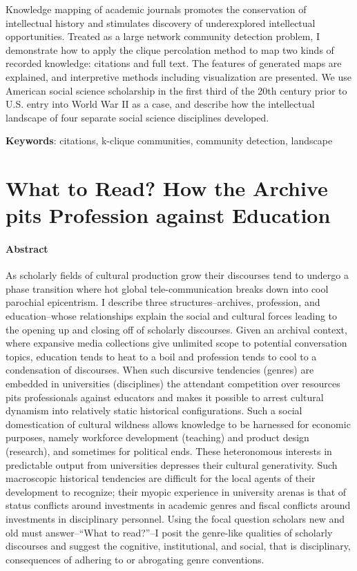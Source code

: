 \documentclass[]{book}
\theoremstyle{definition}
\theoremstyle{definition}
\theoremstyle{definition}
\theoremstyle{remark}
\begin{document}
Knowledge mapping of academic journals promotes the
conservation of intellectual history and stimulates discovery of
underexplored intellectual opportunities. Treated as a large network
community detection problem, I demonstrate how to apply the clique
percolation method to map two kinds of recorded knowledge: citations and
full text. The features of generated maps are explained, and
interpretive methods including visualization are presented. We use
American social science scholarship in the first third of the 20th
century prior to U.S. entry into World War II as a case, and describe
how the intellectual landscape of four separate social science
disciplines developed.




\textbf{Keywords}: citations, k-clique communities, community detection,
landscape

\hypertarget{int}{%
\chapter{What to Read? How the Archive pits Profession against
Education}\label{int}}

\hypertarget{abstract}{%
\subsubsection*{Abstract}\label{abstract}}


As scholarly fields of cultural production grow their
discourses tend to undergo a phase transition where hot global
tele-communication breaks down into cool parochial epicentrism. I
describe three structures--archives, profession, and education--whose
relationships explain the social and cultural forces leading to the
opening up and closing off of scholarly discourses. Given an archival
context, where expansive media collections give unlimited scope to
potential conversation topics, education tends to heat to a boil and
profession tends to cool to a condensation of discourses. When such
discursive tendencies (genres) are embedded in universities
(disciplines) the attendant competition over resources pits
professionals against educators and makes it possible to arrest cultural
dynamism into relatively static historical configurations. Such a social
domestication of cultural wildness allows knowledge to be harnessed for
economic purposes, namely workforce development (teaching) and product
design (research), and sometimes for political ends. These heteronomous
interests in predictable output from universities depresses their
cultural generativity. Such macroscopic historical tendencies are
difficult for the local agents of their development to recognize; their
myopic experience in university arenas is that of status conflicts
around investments in academic genres and fiscal conflicts around
investments in disciplinary personnel. Using the focal question scholars
new and old must answer--``What to read?''--I posit the genre-like
qualities of scholarly discourses and suggest the cognitive,
institutional, and social, that is disciplinary, consequences of
adhering to or abrogating genre conventions.
\end{document}

